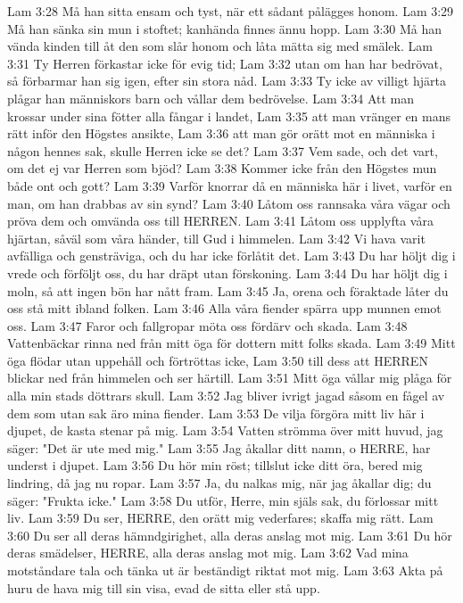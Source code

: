 Lam 3:28  Må han sitta ensam och tyst, när ett sådant pålägges honom.
Lam 3:29  Må han sänka sin mun i stoftet; kanhända finnes ännu hopp.
Lam 3:30  Må han vända kinden till åt den som slår honom och låta mätta sig med smälek.
Lam 3:31  Ty Herren förkastar icke för evig tid;
Lam 3:32  utan om han har bedrövat, så förbarmar han sig igen, efter sin stora nåd.
Lam 3:33  Ty icke av villigt hjärta plågar han människors barn och vållar dem bedrövelse.
Lam 3:34  Att man krossar under sina fötter alla fångar i landet,
Lam 3:35  att man vränger en mans rätt inför den Högstes ansikte,
Lam 3:36  att man gör orätt mot en människa i någon hennes sak, skulle Herren icke se det?
Lam 3:37  Vem sade, och det vart, om det ej var Herren som bjöd?
Lam 3:38  Kommer icke från den Högstes mun både ont och gott?
Lam 3:39  Varför knorrar då en människa här i livet, varför en man, om han drabbas av sin synd?
Lam 3:40  Låtom oss rannsaka våra vägar och pröva dem och omvända oss till HERREN.
Lam 3:41  Låtom oss upplyfta våra hjärtan, såväl som våra händer, till Gud i himmelen.
Lam 3:42  Vi hava varit avfälliga och gensträviga, och du har icke förlåtit det.
Lam 3:43  Du har höljt dig i vrede och förföljt oss, du har dräpt utan förskoning.
Lam 3:44  Du har höljt dig i moln, så att ingen bön har nått fram.
Lam 3:45  Ja, orena och föraktade låter du oss stå mitt ibland folken.
Lam 3:46  Alla våra fiender spärra upp munnen emot oss.
Lam 3:47  Faror och fallgropar möta oss fördärv och skada.
Lam 3:48  Vattenbäckar rinna ned från mitt öga för dottern mitt folks skada.
Lam 3:49  Mitt öga flödar utan uppehåll och förtröttas icke,
Lam 3:50  till dess att HERREN blickar ned från himmelen och ser härtill.
Lam 3:51  Mitt öga vållar mig plåga för alla min stads döttrars skull.
Lam 3:52  Jag bliver ivrigt jagad såsom en fågel av dem som utan sak äro mina fiender.
Lam 3:53  De vilja förgöra mitt liv här i djupet, de kasta stenar på mig.
Lam 3:54  Vatten strömma över mitt huvud, jag säger: "Det är ute med mig."
Lam 3:55  Jag åkallar ditt namn, o HERRE, har underst i djupet.
Lam 3:56  Du hör min röst; tillslut icke ditt öra, bered mig lindring, då jag nu ropar.
Lam 3:57  Ja, du nalkas mig, när jag åkallar dig; du säger: "Frukta icke."
Lam 3:58  Du utför, Herre, min själs sak, du förlossar mitt liv.
Lam 3:59  Du ser, HERRE, den orätt mig vederfares; skaffa mig rätt.
Lam 3:60  Du ser all deras hämndgirighet, alla deras anslag mot mig.
Lam 3:61  Du hör deras smädelser, HERRE, alla deras anslag mot mig.
Lam 3:62  Vad mina motståndare tala och tänka ut är beständigt riktat mot mig.
Lam 3:63  Akta på huru de hava mig till sin visa, evad de sitta eller stå upp.
